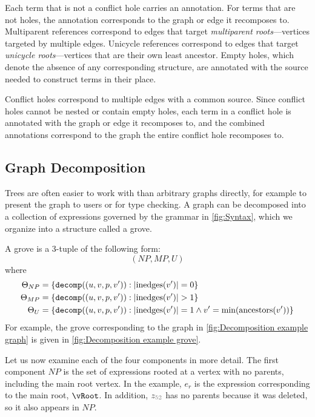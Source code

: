Each term that is not a conflict hole carries an annotation.
For terms that are not holes, the annotation corresponds to the graph or edge it recomposes to.
Multiparent references correspond to edges that target
  \emph{multiparent roots}---vertices targeted by multiple edges.
Unicycle references correspond to edges that target
  \emph{unicycle roots}---vertices that are their own least ancestor.
Empty holes, which denote the absence of any corresponding structure,
are annotated with the source needed to construct terms in their place.

Conflict holes correspond to multiple edges with a common source.
Since conflict holes cannot be nested or contain empty holes,
each term in a conflict hole is annotated with the graph or edge it recomposes to,
and the combined annotations correspond to the graph the entire conflict hole recomposes to.

\subsection{Graph Decomposition}%
\label{sub:Graph Decomposition}



Trees are often easier to work with than arbitrary graphs directly, for example to present the graph to users or for type checking.
A graph can be decomposed into a collection of expressions governed by the grammar in \autoref{fig:Syntax}, which we organize into a structure called a grove.

\figureDecompExample


A grove is a 3-tuple of the following form:
\[
  (NP, MP, U)
\]
where
\begin{align*}
  \Theta_{NP} &= \left\{\operatorname{\texttt{decomp}}\mathopen{}\left((u, v, p, v')\right)\mathclose{} : |\text{inedges}\mathopen{}\left(v'\right)\mathclose{}| = 0\right\} \\ \Theta_{MP} &= \left\{\operatorname{\texttt{decomp}}\mathopen{}\left((u, v, p, v')\right)\mathclose{} : |\text{inedges}\mathopen{}\left(v'\right)\mathclose{}| > 1\right\} \\ \Theta_{U} &= \left\{\operatorname{\texttt{decomp}}\mathopen{}\left((u, v, p, v')\right)\mathclose{} : |\text{inedges}\mathopen{}\left(v'\right)\mathclose{}| = 1 \land v' = \operatorname{\text{min}}\mathopen{}\left(\operatorname{\text{ancestors}}\mathopen{}\left(v'\right)\mathclose{}\right)\mathclose{}\right\}
\end{align*}
For example, the grove corresponding to the graph in \autoref{fig:Decomposition example graph} is
given in \autoref{fig:Decomposition example grove}.

\figureDecompositionDef

Let us now examine each of the four components in more detail.
%
The first component $NP$ is the set of expressions rooted at a vertex with no parents, including the main root vertex.
In the example, $e_r$ is the expression corresponding to the main root, $\vRoot$.
In addition, $z_{\id{52}}$ has no parents because it was deleted, so it also appears in $NP$.

